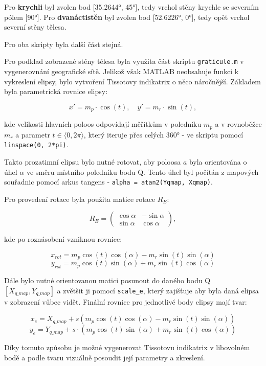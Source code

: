 \documentclass[12pt, a4paper]{article}
\begin{document}
Pro \textbf{krychli} byl zvolen bod [35.2644°, 45°], tedy vrchol stěny krychle se severním pólem [90°]. Pro \textbf{dvanáctistěn} byl zvolen bod [52.6226°, 0°], tedy opět vrchol severní stěny tělesa.

Pro oba skripty byla další část stejná.

Pro podklad zobrazené stěny tělesa byla využita část skriptu \texttt{graticule.m} v vygenerovnání geografické sítě. Jelikož však MATLAB neobsahuje funkci k vykreslení elipsy, bylo vytvoření Tissotovy indikatrix o něco náročnější. Základem byla parametrická rovnice elipsy:

$$x' = m_p \cdot \cos(t), \quad y' = m_r \cdot \sin(t),$$

kde velikosti hlavních poloos odpovídají měřítkům v poledníku $m_p$ a v rovnoběžce $m_r$ a parametr $t \in \langle0, 2\pi\rangle$, který iteruje přes celých 360° - ve skriptu pomocí \texttt{linspace(0, 2*pi)}.

Takto prozatimní elipsu bylo nutné rotovat, aby poloosa $a$ byla orientována o úhel $\alpha$ ve směru místního poledníku bodu Q. Tento úhel byl počítán z mapových souřadnic pomocí arkus tangens - \texttt{alpha = atan2(Yq\textunderscore map, Xq\textunderscore map)}.

Pro provedení rotace byla použita matice rotace $R_E$: 

$$R_E = \begin{pmatrix} \cos\alpha & -\sin\alpha \\ \sin\alpha & \cos\alpha \end{pmatrix},$$

kde po roznásobení vzniknou rovnice:

$$x_{rot} = m_p \cos(t) \cos(\alpha) - m_r \sin(t) \sin(\alpha)$$
$$y_{rot} = m_p \cos(t) \sin(\alpha) + m_r \sin(t) \cos(\alpha)$$

Dále bylo nutné orientovanou matici posunout do daného bodu Q $[X_{q\_map}, Y_{q\_map}]$ a zvětšit ji pomocí \texttt{scale\_e}, který zajišťuje aby byla daná elipsa v zobrazení vůbec vidět. Finální rovnice pro jednotlivé body elipsy mají tvar:

$$x_e = X_{q\_map} + s \left(m_p \cos(t) \cos(\alpha) - m_r \sin(t) \sin(\alpha)\right)$$$$y_e = Y_{q\_map} + s \cdot \left(m_p \cos(t) \sin(\alpha) + m_r \sin(t) \cos(\alpha)\right)$$

Díky tomuto způsobu je možné vygenerovat Tissotovu indikatrix v libovolném bodě a podle tvaru vizuálně posoudit její parametry a zkreslení.

\clearpage
\newpage
\end{document}
